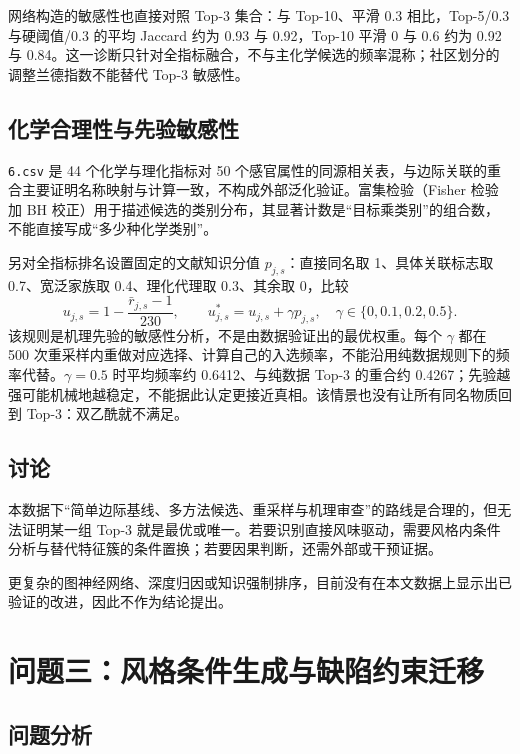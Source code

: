 \documentclass[UTF8,a4paper,zihao=-4]{ctexart}
\numberwithin{figure}{section}
\numberwithin{table}{section}
\numberwithin{equation}{section}
\newcommand{\file}[1]{\texttt{#1}}
\begin{document}
网络构造的敏感性也直接对照 Top-3 集合：与 Top-10、平滑 0.3 相比，Top-5/0.3 与硬阈值/0.3 的平均 Jaccard 约为 0.93 与 0.92，Top-10 平滑 0 与 0.6 约为 0.92 与 0.84。这一诊断只针对全指标融合，不与主化学候选的频率混称；社区划分的调整兰德指数不能替代 Top-3 敏感性。

\subsection{化学合理性与先验敏感性}

\file{6.csv} 是 44 个化学与理化指标对 50 个感官属性的同源相关表，与边际关联的重合主要证明名称映射与计算一致，不构成外部泛化验证。富集检验（Fisher 检验加 BH 校正）用于描述候选的类别分布，其显著计数是“目标乘类别”的组合数，不能直接写成“多少种化学类别”。

另对全指标排名设置固定的文献知识分值 $p_{j,s}$：直接同名取 1、具体关联标志取 0.7、宽泛家族取 0.4、理化代理取 0.3、其余取 0，比较
\begin{equation}
u_{j,s}=1-\frac{\bar r_{j,s}-1}{230},\qquad u^{*}_{j,s}=u_{j,s}+\gamma p_{j,s},\quad\gamma\in\{0,0.1,0.2,0.5\}.
\label{eq:prior}
\end{equation}
该规则是机理先验的敏感性分析，不是由数据验证出的最优权重。每个 $\gamma$ 都在 500 次重采样内重做对应选择、计算自己的入选频率，不能沿用纯数据规则下的频率代替。$\gamma=0.5$ 时平均频率约 0.6412、与纯数据 Top-3 的重合约 0.4267；先验越强可能机械地越稳定，不能据此认定更接近真相。该情景也没有让所有同名物质回到 Top-3：双乙酰就不满足。

\subsection{讨论}

本数据下“简单边际基线、多方法候选、重采样与机理审查”的路线是合理的，但无法证明某一组 Top-3 就是最优或唯一。若要识别直接风味驱动，需要风格内条件分析与替代特征簇的条件置换；若要因果判断，还需外部或干预证据。

更复杂的图神经网络、深度归因或知识强制排序，目前没有在本文数据上显示出已验证的改进，因此不作为结论提出。

\section{问题三：风格条件生成与缺陷约束迁移}
\label{sec:q3}

\subsection{问题分析}
\end{document}

